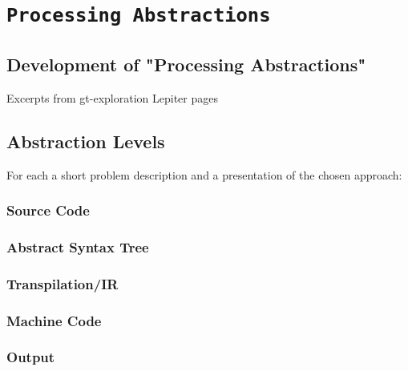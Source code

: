 
\chapter {\texttt{Processing Abstractions}} \label{ch_pa}

\section{Development of "Processing Abstractions"}
Excerpts from gt-exploration Lepiter pages

\section{Abstraction Levels}
For each a short problem description and a presentation of the chosen approach:

\subsection{Source Code}
\subsection{Abstract Syntax Tree}
\subsection{Transpilation/IR}
\subsection{Machine Code}
\subsection{Output}
